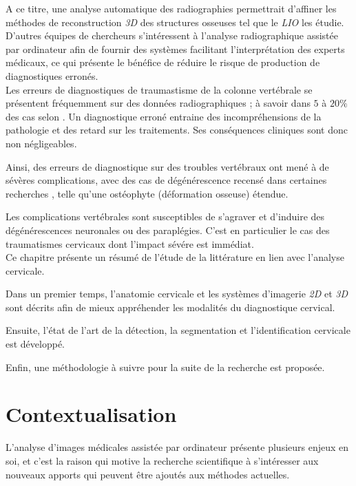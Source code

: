 

A ce titre, une analyse automatique des radiographies permettrait d'affiner les méthodes de reconstruction {\itshape 3D} des structures osseuses tel que le {\itshape LIO} les étudie. D'autres équipes de chercheurs s'intéressent à l'analyse radiographique assistée par ordinateur afin de fournir des systèmes facilitant l'interprétation des experts médicaux, ce qui présente le bénéfice de réduire le risque de production de diagnostiques erronés.
\\

Les erreurs de diagnostiques de traumastisme de la colonne vertébrale se présentent fréquemment sur des données radiographiques ; à savoir dans $5$ à $20\%$ des cas selon \cite{Platzer2006}. Un diagnostique erroné entraine des incompréhensions de la pathologie et des retard sur les traitements. Ses conséquences cliniques sont donc non négligeables.

Ainsi, des erreurs de diagnostique sur des troubles vertébraux ont mené à de sévères complications, avec des cas de dégénérescence recensé dans certaines recherches \cite{Francesco2019, Davis1993}, telle qu'une ostéophyte (déformation osseuse) étendue.

Les complications vertébrales sont susceptibles de s'agraver et d'induire des dégénérescences neuronales ou des paraplégies. C'est en particulier le cas des traumatismes cervicaux dont l'impact sévére est immédiat.
\\

Ce chapitre présente un résumé de l'étude de la littérature en lien avec l'analyse cervicale.

Dans un premier temps, l'anatomie cervicale et les systèmes d'imagerie {\itshape 2D} et {\itshape 3D} sont décrits afin de mieux appréhender les modalités du diagnostique cervical.

Ensuite, l'état de l'art de la détection, la segmentation et l'identification cervicale est développé.

Enfin, une méthodologie à suivre pour la suite de la recherche est proposée.


\section{Contextualisation}

    L'analyse d'images médicales assistée par ordinateur présente plusieurs enjeux en soi, et c'est la raison qui motive la recherche scientifique à s'intéresser aux nouveaux apports qui peuvent être ajoutés aux méthodes actuelles.
    \\

